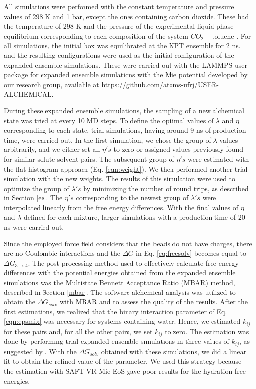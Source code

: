 \documentclass[
	12pt,				%
	openany,			%
	oneside,			%
	a4paper,			%
	english,			%
	brazil				%
	]{abntex2}
\begin{document}
All simulations were performed with the constant temperature and pressure values of 298 K and 1 bar, except the ones containing carbon dioxide. These had the temperature of 298 K and the pressure of the experimental liquid-phase equilibrium corresponding to each composition of the system $CO_{2}+$toluene \cite{co2toliq}. For all simulations, the initial box was equilibrated at the NPT ensemble for 2 ns, and the resulting configurations were used as the initial configuration of the expanded ensemble simulations. These were carried out with the LAMMPS user package for expanded ensemble simulations with the Mie potential developed by our research group, available at https://github.com/atoms-ufrj/USER-ALCHEMICAL. 

During these expanded ensemble simulations, the sampling of a new alchemical state was tried at every 10 MD steps. To define the optimal values of $\lambda$ and $\eta$ corresponding to each state, trial simulations, having around 9 ns of production time, were carried out. In the first simulation, we chose the group of $\lambda$ values arbitrarily, and we either set all $\eta 's$ to zero or assigned values previously found for similar solute-solvent pairs. The subsequent group of $\eta 's$ were estimated with the flat histogram approach (Eq. \eqref{eqn:weight}). We then performed another trial simulation with the new weights. The results of this simulation were used to optimize the group of $\lambda 's$ by minimizing the number of round trips, as described in Section \ref{ee}. The $\eta 's$ corresponding to the newest group of $\lambda 's$ were interpolated linearly from the free energy differences. With the final values of $\eta$ and $\lambda $ defined for each mixture, larger simulations with a production time of 20 ns were carried out. 

Since the employed force field considers that the beads do not have charges, there are no Coulombic interactions and the $\Delta G$ in Eq. \eqref{eq:freesolv} becomes equal to $\Delta G_{3 \rightarrow 4} $. The post-processing method used to effectively calculate free energy differences with the potential energies obtained from the expanded ensemble simulations was the Multistate Bennett Acceptance Ratio (MBAR) method, described in Section \ref{mbar}. The software alchemical-analysis \cite{klimovich} was utilized to obtain the $\Delta G_{solv}$ with MBAR and to assess the quality of the results. After the first estimations, we realized that the binary interaction parameter of Eq. \eqref{eqn:epsmix} was necessary for systems containing water. Hence, we estimated  $k_{ij}$ for these pairs and, for all the other pairs, we set  $k_{ij}$ to zero. The estimation was done by performing trial expanded ensemble simulations in three values of $k_{ij}$, as suggested by . With the $\Delta G_{solv}$ obtained with these simulations, we did a linear fit to obtain the refined value of the parameter. We used this strategy because the estimation with SAFT-VR Mie EoS gave poor results for the hydration free energies.
\end{document}
